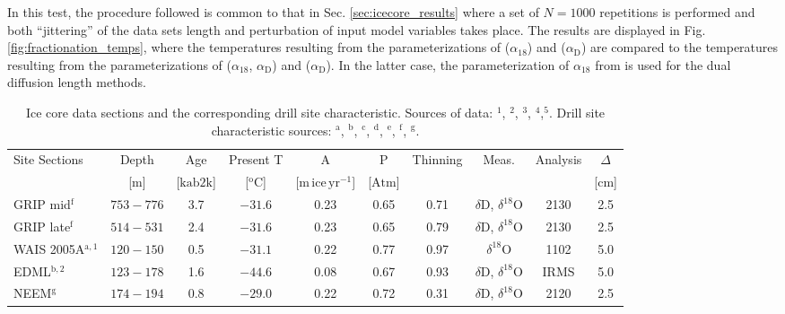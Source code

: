 \documentclass[11pt, draftcls, onecolumn]{IEEEtran} %
\numberwithin{equation}{section}
\numberwithin{table}{section}
\numberwithin{figure}{section}
\begin{document}
In this test, the procedure followed is common to that in Sec. \ref{sec:icecore_results} where a set of $N = 1000$ repetitions is performed
and both ``jittering'' of the data sets length and perturbation of input model variables takes place.
The results are displayed in Fig. \ref{fig:fractionation_temps}, where the temperatures resulting from the parameterizations of
\cite{Majoube1971} ($\alpha_{18}$) and \cite{Merlivat1967} ($\alpha_\mathrm{D}$) are compared to the temperatures resulting from the parameterizations 
of \cite{Ellehoj2013} ($\alpha_{18}$, $\alpha_\mathrm{D}$) and \cite{Lamb2015} ($\alpha_\mathrm{D}$).
In the latter case, the parameterization of $\alpha_{18}$ from \cite{Majoube1971} is used for the dual diffusion length methods.

\begin{table}
	\center
	\caption{Ice core data sections and the corresponding drill site characteristic. Sources of data: \citep{Steig2013}$^\mathrm{1}$, 
		\citep{Oerter2004}$^\mathrm{2}$, \citep{Svensson2015}$^\mathrm{3}$, \citep{Gkinis2011b}$^\mathrm{4}$,\citep{Gkinis2011}$^\mathrm{5}$. Drill site characteristic sources:		
		\citep{Bantaetal2008}$^\mathrm{a}$, \citep{Oerter2004,Veres2013}$^\mathrm{b}$, \citep{Watanabeetal2003,Kawamuraetal2003}$^\mathrm{c}$,
		\citep{Lorius1979}$^\mathrm{d}$, \citep{NGRIPmembers2004,Gkinis2014}$^\mathrm{e}$, \citep{Johnsen2000}$^\mathrm{f}$, \citep{Guillevic2013,Rasmussen2013}$^\mathrm{g}$.
	}\label{tbl:drill_sites}
	\begin{tabular}{l c c c c c c c c c} 
		\toprule
		Site Sections &Depth & Age  & Present T  &
		A & P & Thinning& Meas. & Analysis&$\Delta$\\
		&[$\mathrm{m}$]&[$\mathrm{ka b2k}$]&[$^\mathrm{o}\mathrm{C}$]& [$\mathrm{m \, ice \, yr^{-1}}$]&
		[$\mathrm{Atm}$]& & &&[$\mathrm{cm}$]\\
		\midrule
		GRIP mid$^\mathrm{f}$&$753-776$ & 3.7 &$-31.6 $ & 0.23 & 0.65 & 0.71&$\delta$D, $\delta^{18}$O&2130&2.5\\
		GRIP late$^\mathrm{f}$&$514-531$  &2.4 &$-31.6 $ &0.23 & 0.65  &  0.79&$\delta$D, $\delta^{18}$O&2130&2.5\\	
		WAIS 2005A$^\mathrm{a,1}$ &$120-150$  & 0.5 & $-31.1$ &0.22 & 0.77 & 0.97 &  	 $\delta^{18}$O&1102&5.0\\
		EDML$^\mathrm{b,2}$ & $123-178$&1.6&$-44.6$ & 0.08 & 0.67 & 0.93&$\delta$D, $\delta^{18}$O&IRMS&5.0\\		
		NEEM$^\mathrm{g}$&$174-194 $&0.8 &$-29.0$ & 0.22 &  0.72 &  0.31&$\delta$D, $\delta^{18}$O&2120&2.5\\       

\end{tabular}
\end{table}
\end{document}
